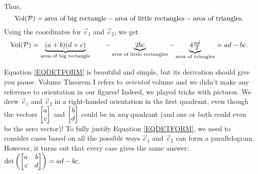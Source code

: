 Thus,
\[
	\operatorname{Vol}(\mathcal P) = \text{area of big rectangle} - \text{area of little rectangles} - \text{area of triangles}.
\]
Using the coordinates for $\vec c_1$ and $\vec c_2$, we get
\begin{equation}
	\label{EQDETFORM}
	\operatorname{Vol}(\mathcal P) = \underbrace{(a+b)(d+c)}_{\text{area of big rectangle}} \qquad -
	\underbrace{2bc}_{\text{area of little rectangles}} -
	\underbrace{4\tfrac{ad}{2}}_{\text{area of triangles}} = ad-bc.
\end{equation}

\begin{center}
\end{center}

Equation \eqref{EQDETFORM} is beautiful and simple, but its derivation should give you pause. Volume Theorem I refers
to \emph{oriented} volume and we didn't make any reference to orientation in our figures! Indeed, we played tricks
with pictures. We drew $\vec c_1$ and $\vec c_2$ in a right-handed orientation in the first quadrant, even though the
vectors $\mat{a\\c}$ and $\mat{b\\d}$ could be in \emph{any} quadrant (and one or both could even be the zero vector)!
To fully justify Equation \eqref{EQDETFORM}, we need to consider cases based on all the possible ways $\vec c_1$ and $\vec c_2$
can form a parallelogram. However, it turns out that every case gives the same answer: $\det\left(\mat{a&b\\c&d}\right)=ad-bc$.

